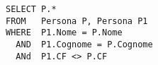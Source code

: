 \begin{lstlisting}
SELECT P.*
FROM   Persona P, Persona P1
WHERE  P1.Nome = P.Nome
  AND  P1.Cognome = P.Cognome
  ANd  P1.CF <> P.CF
\end{lstlisting}
